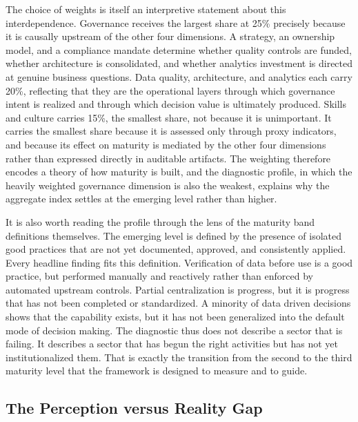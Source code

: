 The choice of weights is itself an interpretive statement about this interdependence. Governance receives the largest share at 25\% precisely because it is causally upstream of the other four dimensions. A strategy, an ownership model, and a compliance mandate determine whether quality controls are funded, whether architecture is consolidated, and whether analytics investment is directed at genuine business questions. Data quality, architecture, and analytics each carry 20\%, reflecting that they are the operational layers through which governance intent is realized and through which decision value is ultimately produced. Skills and culture carries 15\%, the smallest share, not because it is unimportant. It carries the smallest share because it is assessed only through proxy indicators, and because its effect on maturity is mediated by the other four dimensions rather than expressed directly in auditable artifacts. The weighting therefore encodes a theory of how maturity is built, and the diagnostic profile, in which the heavily weighted governance dimension is also the weakest, explains why the aggregate index settles at the emerging level rather than higher.

It is also worth reading the profile through the lens of the maturity band definitions themselves. The emerging level is defined by the presence of isolated good practices that are not yet documented, approved, and consistently applied. Every headline finding fits this definition. Verification of data before use is a good practice, but performed manually and reactively rather than enforced by automated upstream controls. Partial centralization is progress, but it is progress that has not been completed or standardized. A minority of data driven decisions shows that the capability exists, but it has not been generalized into the default mode of decision making. The diagnostic thus does not describe a sector that is failing. It describes a sector that has begun the right activities but has not yet institutionalized them. That is exactly the transition from the second to the third maturity level that the framework is designed to measure and to guide.

\subsection{The Perception versus Reality Gap}

